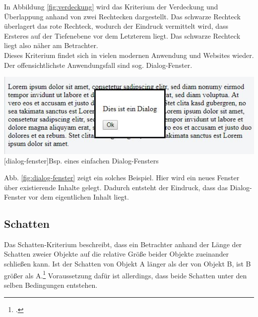 In Abbildung \ref{fig:verdeckung} wird das Kriterium der Verdeckung und Überlappung anhand von zwei Rechtecken dargestellt. Das schwarze Rechteck überlagert das rote Rechteck, wodurch der Eindruck vermittelt wird, dass Ersteres auf der Tiefenebene vor dem Letzterem liegt. Das schwarze Rechteck liegt also näher am Betrachter.\\

Dieses Kriterium findet sich in vielen modernen Anwendung und Websites wieder. Der offensichtlichste Anwendungsfall sind sog. Dialog-Fenster.

\vspace{1em}
\begin{minipage}{\linewidth}
	\centering
	\includegraphics[width=0.7\linewidth]{images/dialog_fenster.jpg}
	[dialog-fenster]{Bsp. eines einfachen Dialog-Fensters}
	\label{fig:dialog-fenster}
\end{minipage}
\vspace{1em} 

Abb. \ref{fig:dialog-fenster} zeigt ein solches Beispiel. Hier wird ein neues Fenster über existierende Inhalte gelegt. Dadurch entsteht der Eindruck, dass das Dialog-Fenster vor dem eigentlichen Inhalt liegt.

\subsection{Schatten}
Das Schatten-Kriterium beschreibt, dass ein Betrachter anhand der Länge der Schatten zweier Objekte auf die relative Größe beider Objekte zueinander schließen kann. Ist der Schatten von Objekt A länger als der von Objekt B, ist B größer als A.\footcite[Vgl.][S.43]{Gras16} Voraussetzung dafür ist allerdings, dass beide Schatten unter den selben Bedingungen entstehen.\\

